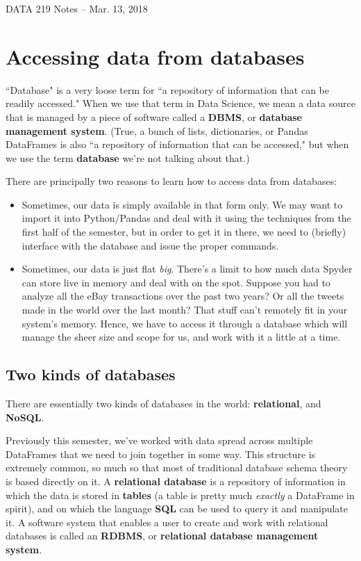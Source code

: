 \documentclass[12pt]{article}
\begin{document}
\begin{center}
\begin{Large}
DATA 219 Notes -- Mar. 13, 2018
\end{Large}
\end{center}

\section{Accessing data from databases}

``Database" is a very loose term for ``a repository of information that can
be readily accessed." When we use that term in Data Science, we mean a data
source that is managed by a piece of software called a \textbf{DBMS}, or
\textbf{database management system}. (True, a bunch of lists, dictionaries, or
Pandas DataFrames is also ``a repository of information that can be accessed,"
but when we use the term \textbf{database} we're not talking about that.)

There are principally two reasons to learn how to access data from databases:

\begin{itemize}
\itemsep.1em
\item Sometimes, our data is simply available in that form only. We may want
to import it into Python/Pandas and deal with it using the techniques from the
first half of the semester, but in order to get it in there, we need to
(briefly) interface with the database and issue the proper commands.
\item Sometimes, our data is just flat \textit{big}. There's a limit to how
much data Spyder can store live in memory and deal with on the spot. Suppose
you had to analyze all the eBay transactions over the past two years? Or all
the tweets made in the world over the last month? That stuff can't remotely
fit in your system's memory. Hence, we have to access it through a database
which will manage the sheer size and scope for us, and work with it a little
at a time.
\end{itemize}

\subsection{Two kinds of databases}

There are essentially two kinds of databases in the world:
\textbf{relational}, and \textbf{NoSQL}.

Previously this semester, we've worked with data spread across multiple
DataFrames that we need to join together in some way. This structure is
extremely common, so much so that most of traditional database schema theory
is based directly on it. A \textbf{relational database} is a repository of
information in which the data is stored in \textbf{tables} (a table is pretty
much \textit{exactly} a DataFrame in spirit), and on which the language
\textbf{SQL} can be used to query it and manipulate it. A software system that
enables a user to create and work with relational databases is called an
\textbf{RDBMS}, or \textbf{relational database management system}.
\end{document}

